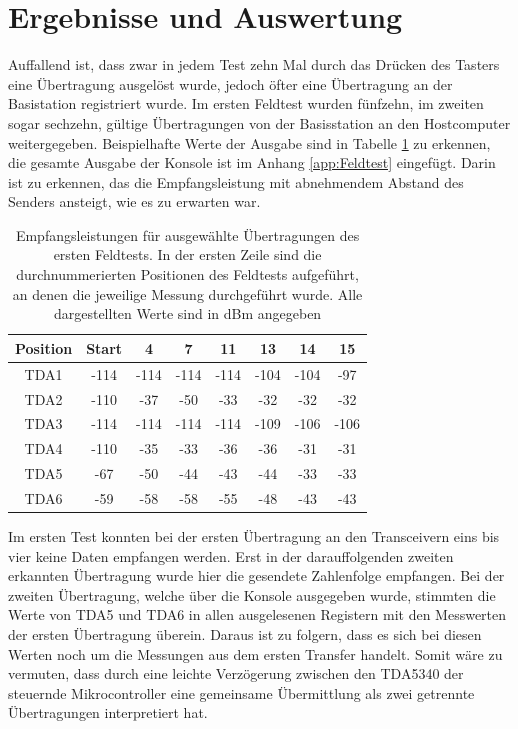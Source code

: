 \section{Ergebnisse und Auswertung}
Auffallend ist, dass zwar in jedem Test zehn Mal durch das Drücken des Tasters eine Übertragung ausgelöst wurde, jedoch öfter eine Übertragung an der Basistation registriert wurde. Im ersten Feldtest wurden fünfzehn, im zweiten sogar sechzehn, gültige Übertragungen von der Basisstation an den Hostcomputer weitergegeben. Beispielhafte Werte der Ausgabe sind in Tabelle \ref{tab:gemesseneWerte} zu erkennen, die gesamte Ausgabe der Konsole ist im  Anhang \ref{app:Feldtest} eingefügt. Darin ist zu erkennen, das die Empfangsleistung mit abnehmendem Abstand des Senders ansteigt, wie es zu erwarten war.


\begin{table}
	\centering
	\begin{tabular}{c|ccccccc}
		Position & Start & 4 & 7 & 11 & 13 & 14 & 15 \\ 
		\hline
		TDA1 & -114 & -114 & -114 & -114 & -104 & -104 & -97 \\ 
		TDA2 & -110 & -37 & -50 & -33 & -32 & -32 & -32 \\ 
		TDA3 & -114 & -114 & -114 & -114 & -109 & -106 & -106 \\ 
		TDA4 & -110 & -35 & -33 & -36 & -36 & -31 & -31 \\ 
		TDA5 & -67 & -50 & -44 & -43 & -44 & -33 & -33 \\ 
		TDA6 & -59 & -58 & -58 & -55 & -48 & -43 & -43 \\ 
	\end{tabular} 
	\caption[Beispielhafte Empfangsleistungen des ersten Feldtests]{Empfangsleistungen für ausgewählte Übertragungen des ersten Feldtests. In der ersten Zeile sind die durchnummerierten Positionen des Feldtests aufgeführt, an denen die jeweilige Messung durchgeführt wurde. Alle dargestellten Werte sind in dBm angegeben}
	\label{tab:gemesseneWerte}
\end{table}


Im ersten Test konnten bei der ersten Übertragung an den Transceivern eins bis vier keine Daten empfangen  werden. Erst in der darauffolgenden zweiten erkannten Übertragung wurde hier die gesendete Zahlenfolge empfangen. Bei der zweiten Übertragung, welche über die Konsole ausgegeben wurde, stimmten die Werte von TDA5 und TDA6 in allen ausgelesenen Registern mit den Messwerten der ersten Übertragung überein.  Daraus ist zu folgern, dass es sich bei diesen Werten noch um die Messungen aus dem ersten Transfer handelt. Somit wäre zu vermuten, dass durch eine leichte Verzögerung zwischen den TDA5340 der steuernde Mikrocontroller eine gemeinsame Übermittlung als zwei getrennte Übertragungen interpretiert hat.

